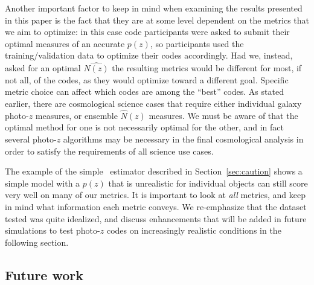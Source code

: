 Another important factor to keep in mind when examining the results presented in this paper is the fact that they are at some level dependent on the metrics that we aim to optimize: in this case code participants were asked to submit their optimal measures of an accurate $p(z)$, so participants used the training/validation data to optimize their codes accordingly.
Had we, instead, asked for an optimal $\hat{N(z)}$ the resulting metrics would be different for most, if not all, of the codes, as they would optimize toward a different goal.
Specific metric choice can affect which codes are among the ``best'' codes.
As stated earlier, there are cosmological science cases that require either individual galaxy photo-$z$ measures, or ensemble $\hat{N}(z)$ measures.
We must be aware of that the optimal method for one is not necessarily optimal for the other, and in fact several photo-$z$ algorithms may be necessary in the final cosmological analysis in order to satisfy the requirements of all science use cases.

The example of the simple \trainz\ estimator described in Section~\ref{sec:caution} shows a simple model with a $p(z)$ that is unrealistic for individual objects can still score very well on many of our metrics.
It is important to look at {\it all} metrics, and keep in mind what information each metric conveys.
We re-emphasize that the dataset tested was quite idealized, and discuss enhancements that will be added in future simulations to test photo-$z$ codes on increasingly realistic conditions in the following section.

\subsection{Future work}
\label{sec:futurework}

